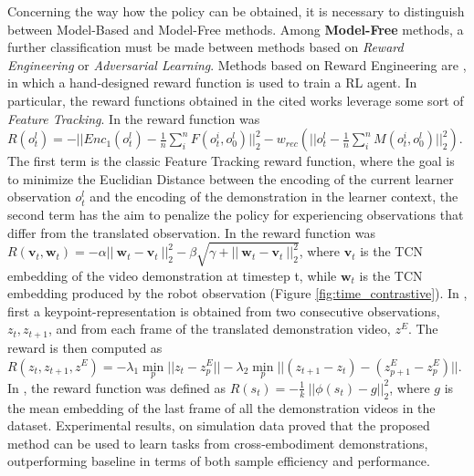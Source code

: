 Concerning the way how the policy can be obtained, it is necessary to distinguish between Model-Based and Model-Free methods. 
\newline Among \textbf{Model-Free} methods, a further classification must be made between methods based on \textit{Reward Engineering} or \textit{Adversarial Learning}.
\newline Methods based on Reward Engineering are \cite{sermanet2018time_contrastive,xiong2021learning_by_watching,zakka2022xirl}, in which a hand-designed reward function is used to train a RL agent. In particular, the reward functions obtained in the cited works leverage some sort of \textit{Feature Tracking}. In \cite{sermanet2018time_contrastive} the reward function was $R(o^{l}_{t}) = -||Enc_{1}(o^{l}_{t}) - \frac{1}{n} \sum_{i}^{n}F(o_{t}^{i},o_{0}^{l})||^{2}_{2} - w_{rec} (||o^{l}_{t} - \frac{1}{n} \sum_{i}^{n}M(o_{t}^{i},o_{0}^{l})||^{2}_{2})$. The first term is the classic Feature Tracking reward function, where the goal is to minimize the Euclidian Distance between the encoding of the current learner observation $o^{l}_{t}$ and the encoding of the demonstration in the learner context, the second term has the aim to penalize the policy for experiencing observations that differ from the translated observation.
In \cite{sermanet2018time_contrastive} the reward function was $R(\textbf{v}_{t}, \textbf{w}_{t}) = - \alpha || \ \textbf{w}_{t} - \textbf{v}_{t} \ ||^{2}_{2} - \beta \sqrt{\gamma + || \ \textbf{w}_{t} - \textbf{v}_{t} \ ||^{2}_{2}}$, where $\textbf{v}_{t}$ is the TCN embedding of the video demonstration at timestep t, while $\textbf{w}_{t}$ is the TCN embedding produced by the robot observation (Figure \ref{fig:time_contrastive}).
In \cite{xiong2021learning_by_watching}, first a keypoint-representation is obtained from two consecutive observations, $z_{t}, z_{t+1}$, and from each frame of the translated demonstration video, $z^{E}$. The reward is then computed as $R(z_{t},z_{t+1},z^{E}) = - \lambda_{1} \underset{p}{\min} ||z_{t}-z^{E}_{p}|| - \lambda_{2} \underset{p}{\min} ||(z_{t+1}-z_{t}) - (z^{E}_{p+1}-z^{E}_{p})||$. %
In \cite{zakka2022xirl}, the reward function was defined as $R(s_{t}) = -\frac{1}{k} \ || \phi(s_{t}) - g||^{2}_{2}$, where $g$ is the mean embedding of the last frame of all the demonstration videos in the dataset. Experimental results, on simulation data proved that the proposed method can be used to learn tasks from cross-embodiment demonstrations, outperforming baseline \cite{sermanet2018time_contrastive} in terms of both sample efficiency and performance.%
